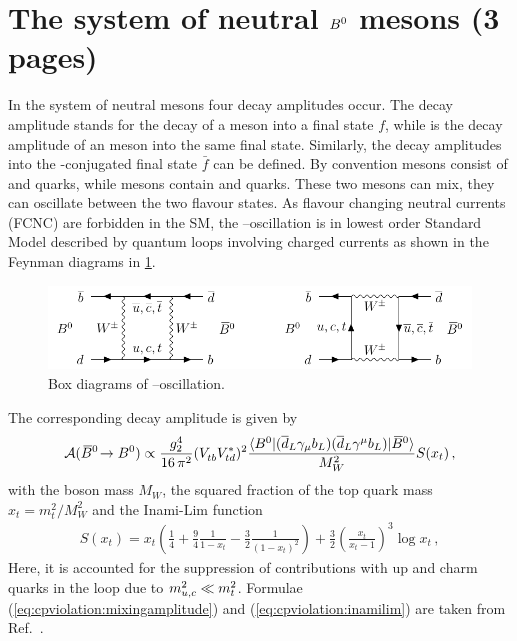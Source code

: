 
\section{The system of neutral \texorpdfstring{${{B}^0}$}{B0} mesons (3 pages)}
\label{sec:cpviolation:neutralBmesons}

In the system of neutral \Bd mesons four decay amplitudes occur. The decay
amplitude \Af stands for the decay of a \Bd meson into a final state $f$, while
\Abarf is the decay amplitude of an \Bdb meson into the same final state.
Similarly, the decay amplitudes into the \CP-conjugated final state $\bar{f}$
can be defined. By convention \Bd mesons consist of \bquarkbar and \dquark
quarks, while \Bdb mesons contain \bquark and \dquarkbar quarks. These two
mesons can mix, \ie they can oscillate between the two flavour states. As
flavour changing neutral currents (FCNC) are forbidden in the SM, the
\Bd--\Bdb oscillation is in lowest order Standard Model described by quantum
loops involving charged currents as shown in the Feynman diagrams in
\cref{fig:cpviolation:neutralBmesons:boxdiagram}.
\begin{figure}[htb]
\centering
\includegraphics[width=\textwidth]{03-CPViolation/tikz/pdf/Boxdiagrams.pdf}
\caption{Box diagrams of \Bd--\Bdb oscillation.}
\label{fig:cpviolation:neutralBmesons:boxdiagram}
\end{figure}
The corresponding decay amplitude is given by
\begin{align}
	\mathcal{A}({{\kern 0.18em\overline{\kern -0.18em B}{}}{}^0}\!\rightarrow{\ensuremath{{B}^0}}) \propto \frac{g_2^4}{16\,\pi^2}({V_{{t}{b}}^{}}{V_{{t}{d}}^\ast})^2 \frac{\langle {\ensuremath{{B}^0}}|({\overline {{d}}}_L\gamma_\mu{\ensuremath{b}}_L)({\overline {{d}}}_L\gamma^\mu{\ensuremath{b}}_L)|{{\kern 0.18em\overline{\kern -0.18em B}{}}{}^0}\rangle}{M_W^2}S(x_t)\,,
\label{eq:cpviolation:mixingamplitude}
\end{align}
with the \W boson mass $M_W$, the squared fraction of the top quark mass $x_t
= m_t^2/M_W^2$ and the Inami-Lim function~\cite{Inami:1980fz}
\begin{align}
	S(x_t) = x_t \left(\frac 14 + \frac 94 \frac{1}{1 - x_t} - \frac 32 \frac{1}{(1 - x_t)^2}\right) + \frac 32 \left(\frac{x_t}{x_t - 1}\right)^3 \log x_t\,,
\label{eq:cpviolation:inamilim}
\end{align}
Here, it is accounted for the suppression of contributions with up and charm
quarks in the loop due to $m_{{u},{c}}^2 \ll m_{{t}}^2$. Formulae
(\ref{eq:cpviolation:mixingamplitude}) and (\ref{eq:cpviolation:inamilim}) are
taken from Ref.~\cite{Brock:2011zz}.

